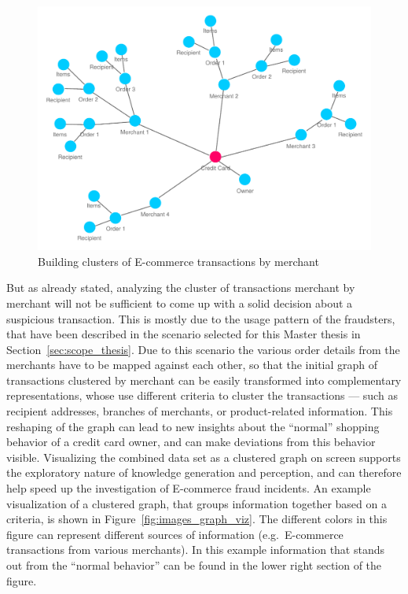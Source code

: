 \begin{figure}[!ht]
  \centering
  \includegraphics[width=0.9\columnwidth]{images/ontology_scenario_2.pdf}
  \caption{Building clusters of E-commerce transactions by merchant}
\label{fig:images_credit_card_graph}
\end{figure}

But as already stated, analyzing the cluster of transactions merchant by merchant will not be sufficient to come up with a solid decision about a suspicious transaction. This is mostly due to the usage pattern of the fraudsters, that have been described in the scenario selected for this Master thesis in Section~\ref{sec:scope_thesis}. Due to this scenario the various order details from the merchants have to be mapped against each other, so that the initial graph of transactions clustered by merchant can be easily transformed into complementary representations, whose use different criteria to cluster the transactions --- such as recipient addresses, branches of merchants, or product-related information. This reshaping of the graph can lead to new insights about the ``normal'' shopping behavior of a credit card owner, and can make deviations from this behavior visible. Visualizing the combined data set as a clustered graph on screen supports the exploratory nature of knowledge generation and perception, and can therefore help speed up the investigation of  \gls{E-commerce} fraud incidents. An example visualization of a clustered graph, that groups information together based on a criteria, is shown in Figure~\ref{fig:images_graph_viz}. The different colors in this figure can represent different sources of information (e.g.\ \gls{E-commerce} transactions from various merchants). In this example information that stands out from the ``normal behavior'' can be found in the lower right section of the figure. \\

